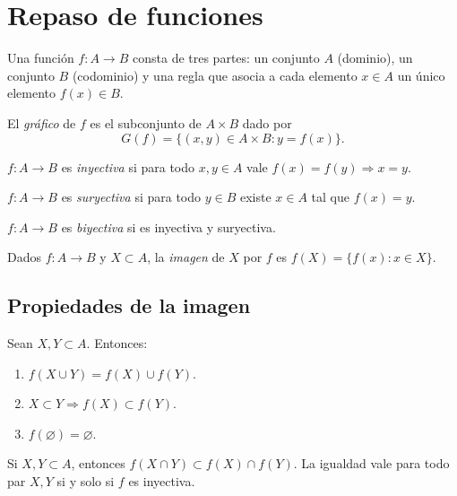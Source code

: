 \section{Repaso de funciones}

Una función \(f\colon A \to B\) consta de tres partes: un conjunto \(A\) (dominio), un conjunto \(B\) (codominio) y una regla que asocia a cada elemento \(x \in A\) un único elemento \(f(x) \in B\).

El \emph{gráfico} de \(f\) es el subconjunto de \(A \times B\) dado por
\[
  G(f) = \{ (x, y) \in A \times B : y = f(x) \}.
\]

\begin{definition}[Inyectividad]
  \(f\colon A \to B\) es \emph{inyectiva} si para todo \(x, y \in A\) vale \(f(x) = f(y) \Rightarrow x = y\).
\end{definition}

\begin{definition}[Suryectividad]
  \(f\colon A \to B\) es \emph{suryectiva} si para todo \(y \in B\) existe \(x \in A\) tal que \(f(x) = y\).
\end{definition}

\begin{definition}[Biyectividad]
  \(f\colon A \to B\) es \emph{biyectiva} si es inyectiva y suryectiva.
\end{definition}

\begin{definition}[Imagen]
  Dados \(f\colon A \to B\) y \(X \subset A\), la \emph{imagen} de \(X\) por \(f\) es \(f(X) = \{ f(x) : x \in X \}\).
\end{definition}

\subsection{Propiedades de la imagen}

\begin{prop}
  Sean \(X, Y \subset A\). Entonces:
  \begin{enumerate}[label=(\arabic*)]
    \item \(f(X \cup Y) = f(X) \cup f(Y)\).
    \item \(X \subset Y \Rightarrow f(X) \subset f(Y)\).
    \item \(f(\varnothing) = \varnothing\).
  \end{enumerate}
\end{prop}

\begin{prop}
  Si \(X, Y \subset A\), entonces \(f(X \cap Y) \subset f(X) \cap f(Y)\). La igualdad vale para todo par \(X, Y\) si y solo si \(f\) es inyectiva.
\end{prop}

